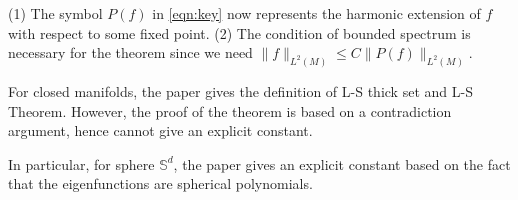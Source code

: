 \begin{remark}
	(1) The symbol $P(f)$ in \cref{eqn:key} now represents the harmonic extension of $f$ with respect to some fixed point. (2) The condition of bounded spectrum is necessary for the theorem since we need $\|f\|_{L^2(M)}\le C\|P(f)\|_{L^2(M)}$.
\end{remark}

For closed manifolds, the paper \cite{ortega2013carleson} gives the definition of L-S thick set and L-S Theorem. However, the proof of the theorem is based on a contradiction argument, hence cannot give an explicit constant.

In particular, for sphere $\mathbb{S}^{d}$, the paper \cite{dicke2022spherical} gives an explicit constant based on the fact that the eigenfunctions are spherical polynomials.  







